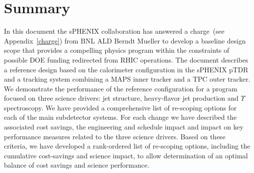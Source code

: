 \section{Summary}

In this document the sPHENIX collaboration has answered a charge~(see
Appendix~\ref{charge}) from BNL ALD Berndt Mueller to develop
a baseline design scope that provides a compelling physics program
within the constraints of possible DOE funding redirected from
RHIC operations. The document describes a reference design based
on the calorimeter configuration in the sPHENIX pTDR and a tracking system
combining a MAPS inner tracker and a TPC outer tracker. We
demonstrate the performance of the reference configuration for 
a program focused on three science drivers: jet structure,
heavy-flavor jet production and $\Upsilon$ spectroscopy.
We have provided a comprehensive list of re-scoping options for each
of the main subdetector systems. For each change we have 
described the associated
cost savings, the engineering and schedule impact and impact on
key performance measures related to the three science
drivers. Based on these criteria, we have developed a
rank-ordered list of re-scoping options, including the
cumulative cost-savings and science impact, to allow determination
of an optimal balance of cost savings and science performance.
